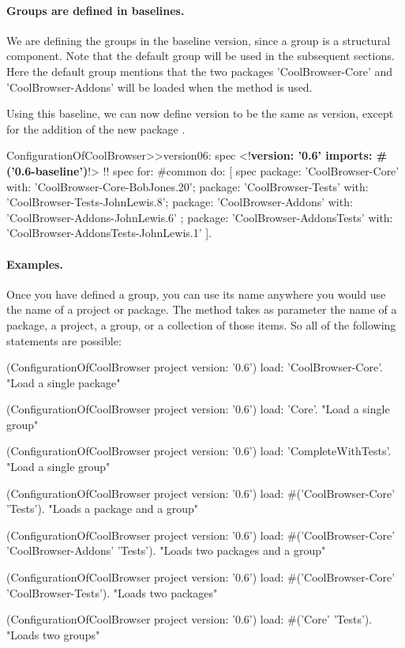 \documentclass[a4paper,10pt,twoside]{book}
\begin{document}
 
\paragraph{Groups are defined in baselines.} 
We are defining the groups in the baseline version, since a group is a structural component. Note that the default group will be used in the subsequent sections. Here the default group mentions that the two packages 'CoolBrowser-Core' and 'CoolBrowser-Addons' will be loaded when the method  is used.

Using this baseline, we can now define version  to be the same as version, except for the addition of the new package .
 
\begin{code}{}
ConfigurationOfCoolBrowser>>version06: spec 
       <!\textbf{version: '0.6' imports: \#('0.6-baseline')}!>
!\vspace{-0.7ex}!
      spec for: #common do: [
            spec 
                  package: 'CoolBrowser-Core' with: 'CoolBrowser-Core-BobJones.20';
                  package: 'CoolBrowser-Tests' with: 'CoolBrowser-Tests-JohnLewis.8';
                  package: 'CoolBrowser-Addons' with: 'CoolBrowser-Addons-JohnLewis.6' ;
                  package: 'CoolBrowser-AddonsTests' with: 'CoolBrowser-AddonsTests-JohnLewis.1' ].
\end{code}

 

\paragraph{Examples.} Once you have defined a group, you can use its name anywhere you would use the name of a project or package. The   method takes as parameter the name of a package, a project, a group, or a collection of those items.  So all of the following statements are possible:

 
\begin{code}{}
(ConfigurationOfCoolBrowser project version: '0.6') load: 'CoolBrowser-Core'. 
       "Load a single package"

(ConfigurationOfCoolBrowser project version: '0.6') load: 'Core'. 
       "Load a single group"

(ConfigurationOfCoolBrowser project version: '0.6') load: 'CompleteWithTests'.  
       "Load a single group"
 
(ConfigurationOfCoolBrowser project version: '0.6') 
       load: #('CoolBrowser-Core' 'Tests').    
       "Loads a package and a group"

(ConfigurationOfCoolBrowser project version: '0.6') 
       load: #('CoolBrowser-Core' 'CoolBrowser-Addons' 'Tests'). 
       "Loads two packages and a group" 

(ConfigurationOfCoolBrowser project version: '0.6') 
       load: #('CoolBrowser-Core' 'CoolBrowser-Tests').
       "Loads two packages"
  
(ConfigurationOfCoolBrowser project version: '0.6') load: #('Core' 'Tests'). 
       "Loads two groups"
\end{code}
\end{document}
